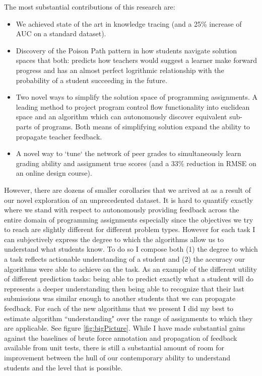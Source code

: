The most substantial contributions of this research are:
\begin{itemize}
\item We achieved state of the art in knowledge tracing (and a 25\% increase of AUC on a standard dataset). 

\item Discovery of the Poison Path pattern in how students navigate solution spaces that both: predicts how teachers would suggest a learner make forward progress and has an almost perfect logrithmic relationship with the probability of a student succeeding in the future.

\item Two novel ways to simplify the solution space of programming assignments. A leading method to project program control flow functionality into euclidean space and an algorithm which can autonomously discover equivalent sub-parts of programs. Both means of simplifying solution expand the ability to propagate teacher feedback.

\item A novel way to `tune` the network of peer grades to simultaneously learn grading ability and assignment true scores (and a 33\% reduction in RMSE on an online design course).

\end{itemize}
However, there are dozens of smaller corollaries that we arrived at as a result of our novel exploration of an unprecedented dataset. It is hard to quantify exactly where we stand with respect to autonomously providing feedback across the entire domain of programming assignments especially since the objectives we try to reach are slightly different for different problem types. However for each task I can subjectively express the degree to which the algorithms allow us to understand what students know. To do so I compose both (1) the degree to which a task reflects actionable understanding of a student and (2) the accuracy our algorithms were able to achieve on the task. As an example of the different utility of different prediction tasks: being able to predict exactly what a student will do represents a deeper understanding then being able to recognize that their last submissions was similar enough to another students that we can propagate feedback. For each of the new algorithms that we present I did my best to estimate algorithm ``understanding" over the range of assignments to which they are applicable. See figure \ref{fig:bigPicture}. While I have made substantial gains against the baselines of brute force annotation and propagation of feedback available from unit tests, there is still a substantial amount of room for improvement between the hull of our contemporary ability to understand students and the level that is possible.

